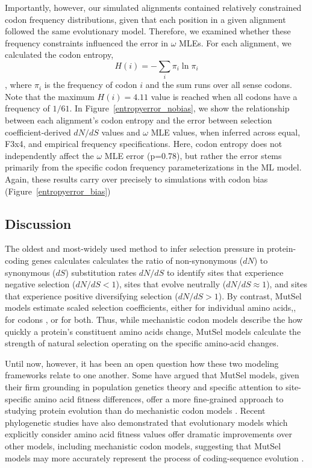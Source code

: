 \documentclass[11pt]{article}
\begin{document}
Importantly, however, our simulated alignments contained relatively constrained codon frequency distributions, given that each position in a given alignment followed the same evolutionary model. Therefore, we examined whether these frequency constraints influenced the error in $\omega$ MLEs. For each alignment, we calculated the codon entropy, \begin{equation} H(i) = - \sum_i \pi_i \ln \pi_i \end{equation}, where $\pi_i$ is the frequency of codon $i$ and the sum runs over all sense codons. Note that the maximum $H(i) = 4.11$ value is reached when all codons have a frequency of $1/61$. In Figure~\ref{entropyerror_nobias}, we show the relationship between each alignment's codon entropy and the error between selection coefficient-derived $dN/dS$ values and $\omega$ MLE values, when inferred across equal, F3x4, and empirical frequency specifications. Here, codon entropy does not independently affect the $\omega$ MLE error (p=0.78), but rather the error stems primarily from the specific codon frequency parameterizations in the ML model. Again, these results carry over precisely to simulations with codon bias (Figure~\ref{entropyerror_bias})



\subsection*{Discussion}
The oldest and most-widely used method to infer selection pressure in protein-coding genes calculates calculates the ratio of non-synonymous ($dN$) to synonymous ($dS$) substitution rates $dN/dS$ to identify sites that experience negative selection ($dN/dS<1$), sites that evolve neutrally ($dN/dS\approx1$), and sites that experience positive diversifying selection ($dN/dS>1$). By contrast, MutSel models estimate scaled selection coefficients, either for individual amino acids,\cite{HalpernBruno1998,NielsenYang2008,Rodrigueetal2010,Tamurietal2012,Tamurietal2014}, for codons \cite{YangNielsen2008}, or for both. Thus, while mechanistic codon models describe the how quickly a protein's constituent amino acids change, MutSel models calculate the strength of natural selection operating on the specific amino-acid changes.  

Until now, however, it has been an open question how these two modeling frameworks relate to one another. Some have argued that MutSel models, given their firm grounding in population genetics theory and specific attention to site-specific amino acid fitness differences, offer a more fine-grained approach to studying protein evolution than do mechanistic codon models \cite{HalpernBruno1998,Rodrigueetal2010}. Recent phylogenetic studies have also demonstrated that evolutionary models which explicitly consider amino acid fitness values offer dramatic improvements over other models, including mechanistic codon models, suggesting that MutSel models may more accurately represent the process of coding-sequence evolution \cite{Bloom2014a, Bloom2014b}. 
\end{document}
